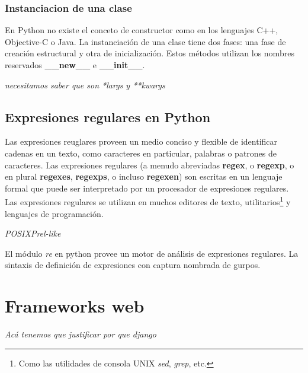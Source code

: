 \documentclass[a4paper]{report}
\begin{document}
\subsubsection*{Instanciacion de una clase}
En Python no existe el conceto de constructor como en los lenguajes C++, Objective-C o 
Java. La instanciación de una clase tiene dos fases: una fase de creación estructural y
otra de inicialización. Estos métodos utilizan los nombres reservados \textbf{\_\_new\_\_} e
\textbf{\_\_init\_\_}.

\emph{necesitamos saber que son *largs y **kwargs}




\subsection{Expresiones regulares en Python}
Las expresiones reuglares proveen un medio conciso y flexible de identificar cadenas en un texto, como
caracteres en particular, palabras o patrones de caracteres. Las expresiones regulares (a menudo
abreviadas \textbf{regex}, o \textbf{regexp}, o en plural \textbf{regexes}, \textbf{regexps}, o incluso \textbf{regexen})
son escritas en un lenguaje formal que puede ser interpretado por un procesador de expresiones regulares.
Las expresiones regulares se utilizan en muchos editores de texto, utilitarios\footnote{
Como las utilidades de consola UNIX \emph{sed}, \emph{grep}, etc.} y lenguajes de programación.

\emph{POSIX}\emph{Prel-like}

El módulo \emph{re} en python provee un motor de análisis de expresiones regulares.
La sintaxis de definición de expresiones con captura nombrada de gurpos.



\section{Frameworks web}
\emph{Acá tenemos que justificar por que django}
\end{document}
